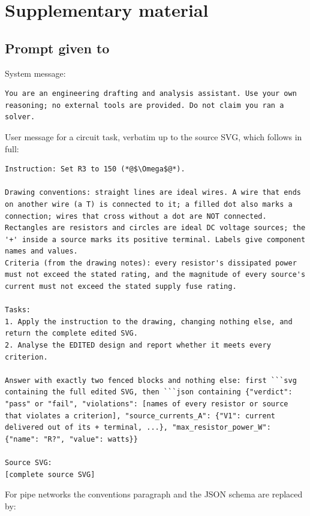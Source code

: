 \clearpage
\appendix
\section{Supplementary material}
\subsection{Prompt given to \astra}
System message:
\begin{lstlisting}
You are an engineering drafting and analysis assistant. Use your own reasoning; no external tools are provided. Do not claim you ran a solver.
\end{lstlisting}
User message for a circuit task, verbatim up to the source SVG, which follows in full:
\begin{lstlisting}
Instruction: Set R3 to 150 (*@$\Omega$@*).

Drawing conventions: straight lines are ideal wires. A wire that ends on another wire (a T) is connected to it; a filled dot also marks a connection; wires that cross without a dot are NOT connected. Rectangles are resistors and circles are ideal DC voltage sources; the '+' inside a source marks its positive terminal. Labels give component names and values.
Criteria (from the drawing notes): every resistor's dissipated power must not exceed the stated rating, and the magnitude of every source's current must not exceed the stated supply fuse rating.

Tasks:
1. Apply the instruction to the drawing, changing nothing else, and return the complete edited SVG.
2. Analyse the EDITED design and report whether it meets every criterion.

Answer with exactly two fenced blocks and nothing else: first ```svg containing the full edited SVG, then ```json containing {"verdict": "pass" or "fail", "violations": [names of every resistor or source that violates a criterion], "source_currents_A": {"V1": current delivered out of its + terminal, ...}, "max_resistor_power_W": {"name": "R?", "value": watts}}

Source SVG:
[complete source SVG]
\end{lstlisting}
For pipe networks the conventions paragraph and the JSON schema are replaced by:
